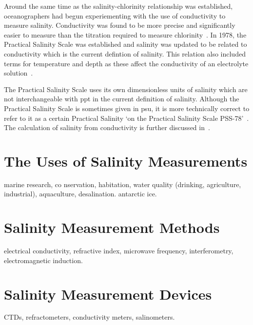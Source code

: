 Around the same time as the salinity-chlorinity relationship was established, oceanographers had begun experiementing with the use of conductivity to measure salinity.
Conductivity was found to be more precise and significantly easier to measure than the titration required to measure chlorinity~\cite{lewis_salinity_definition_and_calculation_1978}.
In 1978, the Practical Salinity Scale was established and salinity was updated to be related to conductivity which is the current defintion of salinity\cite{lewis_salinity_definition_and_calculation_1978}.
This relation also included terms for temperature and depth as these affect the conductivity of an electrolyte solution~\cite{zheng_electrical_conductivity_of_ocean_2017}.

The Practical Salinity Scale uses its own dimensionless units of salinity which are not interchangeable with \acrlong{ppt} in the current definition of salinity.
Although the Practical Salinity Scale is sometimes given in \acrfull{psu}, it is more technically correct to refer to it as a certain Practical Salinity `on the Practical Salinity Scale PSS-78'~\cite{lewis_salinity_definition_and_calculation_1978}.
The calculation of salinity from conductivity is further discussed in~.

\section{The Uses of Salinity Measurements}\label{sec:the-uses-of-salinity-measurements}
marine research, co nservation, habitation, water quality (drinking, agriculture, industrial), aquaculture, desalination.
antarctic ice.

\section{Salinity Measurement Methods}\label{sec:salinity-measurement-techniques}
electrical conductivity, refractive index, microwave frequency, interferometry, electromagnetic induction.

\section{Salinity Measurement Devices}\label{sec:salinity-measurement-devices}
CTDs, refractometers, conductivity meters, salinometers.


